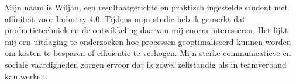 

\begin{cvparagraph}

Mijn naam is Wiljan, een resultaatgerichte en praktisch ingestelde student met affiniteit voor Industry 4.0. Tijdens mijn studie heb ik gemerkt dat productietechniek en de ontwikkeling daarvan mij enorm interesseren. Het lijkt mij een uitdaging te onderzoeken hoe processen geoptimaliseerd kunnen worden om kosten te besparen of efficiëntie te verhogen. Mijn sterke communicatieve en sociale vaardigheden zorgen ervoor dat ik zowel zelfstandig als in teamverband kan werken. 

\end{cvparagraph}
